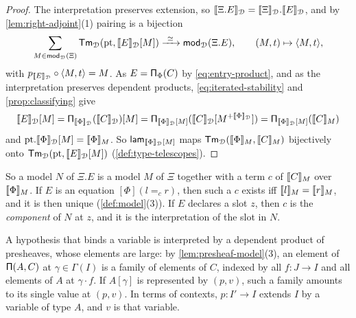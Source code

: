 \begin{proof}
    The interpretation preserves extension, so $\llbracket\Xi.E\rrbracket_{\mathcal{D}} = \llbracket\Xi\rrbracket_{\mathcal{D}}.\llbracket E\rrbracket_{\mathcal{D}}$, and by \cref{lem:right-adjoint}(1) pairing is a bijection
    \[
        \sum_{M \in \mathsf{mod}_{\mathcal{D}}(\Xi)} \mathsf{Tm}_{\mathcal{D}}(\mathrm{pt}, \llbracket E\rrbracket_{\mathcal{D}}[M]) \xrightarrow{\ \simeq\ } \mathsf{mod}_{\mathcal{D}}(\Xi.E), \qquad (M, t) \mapsto \langle M, t \rangle,
    \]
    with $p_{\llbracket E\rrbracket_{\mathcal{D}}} \circ \langle M, t \rangle = M$. As $E = \mathsf{\Pi}_\Phi(C)$ by \eqref{eq:entry-product}, and as the interpretation preserves dependent products, \eqref{eq:iterated-stability} and \cref{prop:classifying} give
    \[
        \llbracket E\rrbracket_{\mathcal{D}}[M] = \mathsf{\Pi}_{\llbracket\Phi\rrbracket_{\mathcal{D}}}(\llbracket C\rrbracket_{\mathcal{D}})[M] = \mathsf{\Pi}_{\llbracket\Phi\rrbracket_{\mathcal{D}}[M]}(\llbracket C\rrbracket_{\mathcal{D}}[M^{+\llbracket\Phi\rrbracket_{\mathcal{D}}}]) = \mathsf{\Pi}_{\llbracket\Phi\rrbracket_{\mathcal{D}}[M]}(\llbracket C\rrbracket_M)
    \]
    and $\mathrm{pt}.\llbracket\Phi\rrbracket_{\mathcal{D}}[M] = \llbracket\Phi\rrbracket_M$. So $\mathsf{lam}_{\llbracket\Phi\rrbracket_{\mathcal{D}}[M]}$ maps $\mathsf{Tm}_{\mathcal{D}}(\llbracket\Phi\rrbracket_M, \llbracket C\rrbracket_M)$ bijectively onto $\mathsf{Tm}_{\mathcal{D}}(\mathrm{pt}, \llbracket E\rrbracket_{\mathcal{D}}[M])$ (\cref{def:type-telescopes}).
\end{proof}

So a model $N$ of $\Xi.E$ is a model $M$ of $\Xi$ together with a term $c$ of $\llbracket C\rrbracket_M$ over $\llbracket\Phi\rrbracket_M$. If $E$ is an equation $[\Phi](l =_c r)$, then such a $c$ exists iff $\llbracket l\rrbracket_M = \llbracket r\rrbracket_M$, and it is then unique (\cref{def:model}(3)). If $E$ declares a slot $z$, then $c$ is the \emph{component} of $N$ at $z$, and it is the interpretation of the slot in $N$.

A hypothesis that binds a variable is interpreted by a dependent product of presheaves, whose elements are large: by \cref{lem:presheaf-model}(3), an element of $\mathsf{\Pi}(A, C)$ at $\gamma \in \Gamma(I)$ is a family of elements of $C$, indexed by all $f : J \to I$ and all elements of $A$ at $\gamma \cdot f$. If $A[\gamma]$ is represented by $(p, v)$, such a family amounts to its single value at $(p, v)$. In terms of contexts, $p : I' \to I$ extends $I$ by a variable of type $A$, and $v$ is that variable.

